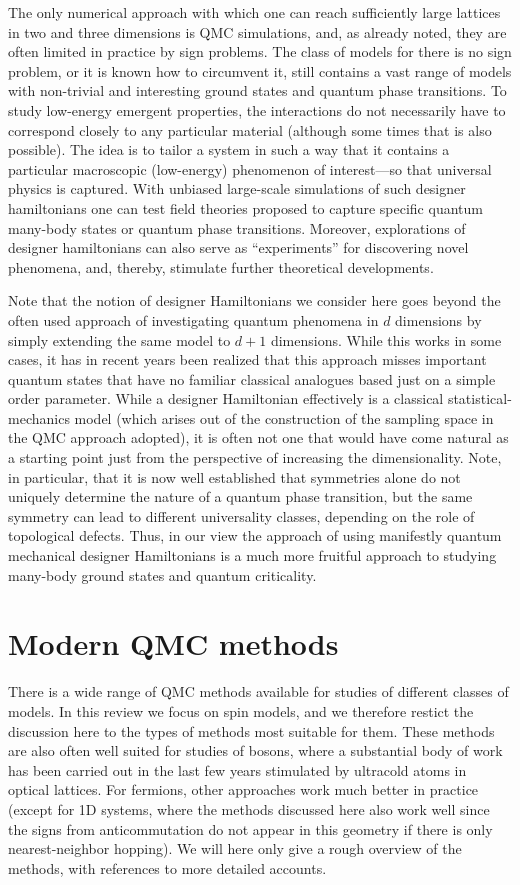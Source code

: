 \documentclass[aps,prb,groupedaddress,twocolumn]{revtex4}
\begin{document}
The only numerical approach with which one can reach sufficiently large lattices in two and three dimensions
is QMC simulations, and, as already noted, they are often limited in practice by sign problems. The class of
models for there is no sign problem, or it is known how to circumvent it, still contains a vast range of 
models with non-trivial and interesting ground states and quantum phase transitions. To study low-energy
emergent properties, the interactions do not necessarily have to correspond closely to any particular material
(although some times that is also possible). The idea is to tailor a system in such a way that it contains a particular 
macroscopic (low-energy) phenomenon of interest---so that universal physics is captured. With unbiased large-scale 
simulations of such designer hamiltonians one can test field theories proposed to capture specific quantum many-body 
states or quantum phase transitions. Moreover, explorations of designer hamiltonians can also serve as ``experiments'' 
for discovering novel phenomena, and, thereby, stimulate further theoretical developments.

Note that the notion of designer Hamiltonians we consider here goes beyond the often used approach of investigating
quantum phenomena in $d$ dimensions by simply extending the same model to $d+1$ dimensions. While this works in some cases,
it has in recent years been realized that this approach misses important quantum states that have no familiar classical
analogues based just on a simple order parameter. While a designer Hamiltonian effectively is a classical statistical-mechanics
model (which arises out of the construction of the sampling space in the QMC approach adopted), it is often not one that 
would have come natural as a starting point just from the perspective of increasing the dimensionality. Note, in particular, 
that it is now well established that symmetries alone do not uniquely determine the nature of a quantum phase transition, 
but the same symmetry can lead to different universality classes, depending on the role of topological defects. Thus, in our
view the approach of using manifestly quantum mechanical designer Hamiltonians is a much more fruitful approach to studying 
many-body ground states and quantum criticality.

\section{Modern QMC methods}

There is a wide range of QMC methods available for studies of different classes of models. In this review we focus on spin models, and we 
therefore restict the discussion here to the types of methods most suitable for them. These methods are also often well suited for studies of 
bosons, where a substantial body of work has been carried out in the last few years stimulated by ultracold atoms in optical lattices. For 
fermions, other approaches work much better in practice (except for 1D systems, where the methods discussed here also work well since the signs 
from anticommutation do not appear in this geometry if there is only nearest-neighbor hopping). We will here only give a rough overview of the 
methods, with references to more detailed accounts.
\end{document}
